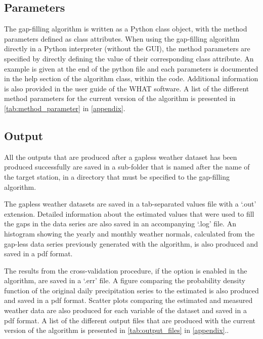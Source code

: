 \documentclass[TechnicalNoteMeteo.tex]{subfiles}
\begin{document}
\subsection{Parameters}\label{sec:parameters}

The gap-filling algorithm is written as a Python class object, with the method parameters defined as class attributes. When using the gap-filling algorithm directly in a Python interpreter (without the GUI), the method parameters are specified by directly defining the value of their corresponding class attribute. An example is given at the end of the python file and each parameters is documented in the help section of the algorithm class, within the code. Additional information is also provided in the user guide of the WHAT software. A list of the different method parameters for the current version of the algorithm is presented in \cref{tab:method_parameter} in \ref{appendix}.

\subsection{Output}\label{sec:output}

All the outputs that are produced after a gapless weather dataset has been produced successfully are saved in a sub-folder that is named after the name of the target station, in a directory that must be specified to the gap-filling algorithm.

The gapless weather datasets are saved in a tab-separated values file with a `.out' extension. Detailed information about the estimated values that were used to fill the gaps in the data series are also saved in an accompanying `.log' file. An histogram showing the yearly and monthly weather normals, calculated from the gap-less data series previously generated with the algorithm, is also produced and saved in a pdf format. 

The results from the cross-validation procedure, if the option is enabled in the algorithm, are saved in a `.err' file. A figure comparing the probability density function of the original daily precipitation series to the estimated is also produced and saved in a pdf format. Scatter plots comparing the estimated and measured weather data are also produced for each variable of the dataset and saved in a pdf format. A list of the different output files that are produced with the current version of the algorithm is presented in \cref{tab:output_files} in \ref{appendix}..
\end{document}
